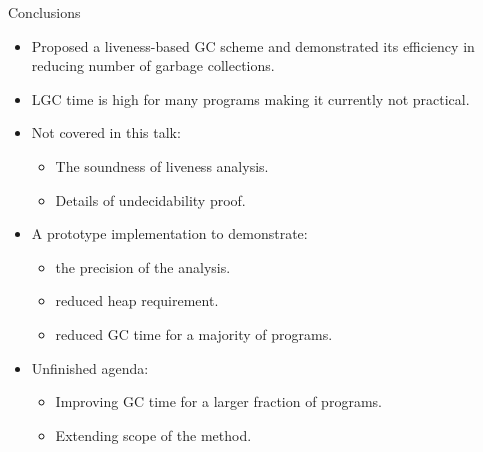 \documentclass[xcolor=x11names,compress,mathserif]{beamer}
\renewcommand{\(}{\begin{columns}}
\renewcommand{\)}{\end{columns}}
\newcommand{\<}[1]{\begin{column}{#1}}
\renewcommand{\>}{\end{column}}
\begin{document}
\begin{frame}{Conclusions}
  \begin{itemize}\itemsep1em
  \item Proposed a liveness-based GC scheme and demonstrated its efficiency in reducing number of garbage collections.
  \item LGC time is high for many programs making it currently not practical.
  \item Not covered in this talk:
    \begin{itemize}
    \item The soundness of liveness analysis.
    \item Details of undecidability proof.
    \end{itemize}
    \item A prototype implementation to demonstrate:
      \begin{itemize}
      \item the precision of the analysis.
      \item reduced heap requirement.
      \item reduced GC time for a majority of programs.
    \end{itemize}
    \item Unfinished agenda:
      \begin{itemize}
      \item Improving GC time for a larger fraction of programs.
      \item Extending scope of the method.
    \end{itemize}
  \end{itemize}
\end{frame}
\end{document}
